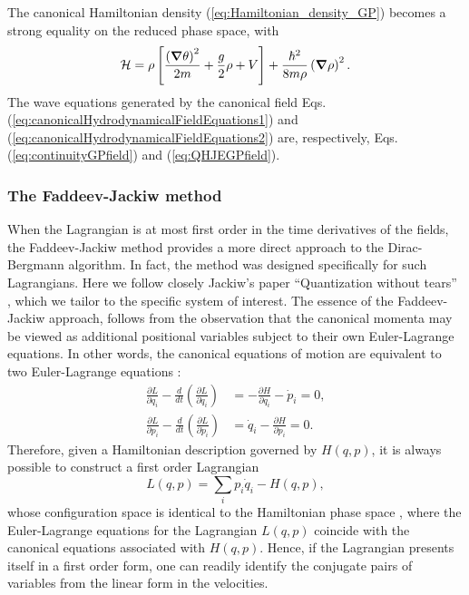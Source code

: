\documentclass[twocolumn, nofootinbib, nobibnotes, amsmath,amssymb,aps, pra, floatfix]{revtex4-1}
\newcommand{\gv}[1]{\ensuremath{\mbox{\boldmath$ #1 $}}} %
\newcommand{\pd}[2]{\frac{\partial #1}{\partial #2}} %
\newcommand{\grad}[1]{\gv{\nabla} #1} %
\begin{document}
The canonical Hamiltonian density (\ref{eq:Hamiltonian_density_GP}) becomes a strong equality on the reduced phase space, with
\begin{equation}
  \mathcal{H}=\rho\left[ \frac{\left( \grad{\theta} \right)^2}{2m}+\frac{g}{2}\rho +V\right]+\frac{\hbar^2}{8m\rho}\left( \grad{\rho} \right)^2.
  \label{eq:canonicalHamiltonianDensityHydrodynamicGPfield}
\end{equation}
The wave equations generated by the canonical field Eqs. (\ref{eq:canonicalHydrodynamicalFieldEquations1}) and (\ref{eq:canonicalHydrodynamicalFieldEquations2}) are, respectively, Eqs. (\ref{eq:continuityGPfield}) and (\ref{eq:QHJEGPfield}).
\subsubsection{\label{sec:GPfieldHydrodynamicCanonicalFormalismFJmethod}The Faddeev-Jackiw method}
When the Lagrangian is at most first order in the time derivatives of the fields, the Faddeev-Jackiw method provides a more direct approach to the Dirac-Bergmann algorithm.
In fact, the method was designed specifically for such Lagrangians.
Here we follow closely Jackiw's paper ``Quantization without tears'' \cite{jackiw1994quantization}, which we tailor to the specific system of interest.
The essence of the Faddeev-Jackiw approach, follows from the observation that the canonical momenta may be viewed as additional positional variables subject to their own Euler-Lagrange equations. 
In other words, the canonical equations of motion are equivalent to two Euler-Lagrange equations \cite{lanczos2012variational}:
\begin{align}
  \pd{L}{q_i}-\frac{d}{dt}\left( \pd{L}{\dot{q}_i} \right)&=-\pd{H}{q_i}-\dot{p}_i=0, \\
  \pd{L}{p_i}-\frac{d}{dt}\left( \pd{L}{\dot{p}_i} \right)&=\dot{q}_i -\pd{H}{p_i}=0. 
  \label{}
\end{align}
Therefore, given a Hamiltonian description governed by $H\left( q,p \right)$, it is always possible to construct a first order Lagrangian
\begin{equation}
  L\left( q,p \right)=\sum_i p_i\dot{q}_i - H\left( q,p \right),
  \label{}
\end{equation}
whose configuration space is identical to the Hamiltonian phase space \cite{jackiw1994quantization}, where the Euler-Lagrange equations for the Lagrangian $L\left( q,p \right)$ coincide with the canonical equations associated with $H\left( q,p \right)$.
Hence, if the Lagrangian presents itself in a first order form, one can readily identify the conjugate pairs of variables from the linear form in the velocities.
\end{document}
